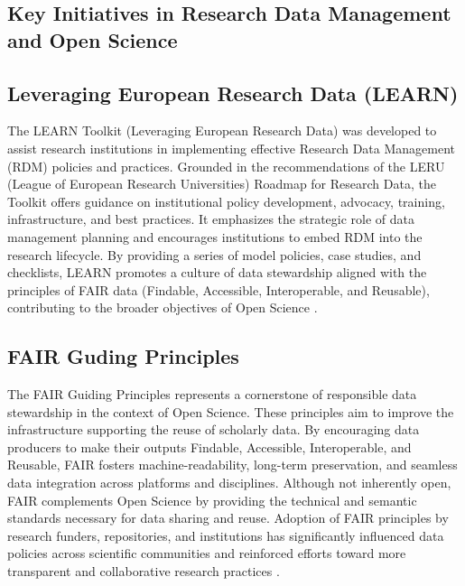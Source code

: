 \documentclass{article}
\begin{document}
\subsection{Key Initiatives in Research Data Management and Open Science}

\subsection{Leveraging European Research Data (LEARN)}
The LEARN Toolkit (Leveraging European Research Data) was developed to assist research institutions in implementing effective Research Data Management (RDM) policies and practices. Grounded in the recommendations of the LERU (League of European Research Universities) Roadmap for Research Data, the Toolkit offers guidance on institutional policy development, advocacy, training, infrastructure, and best practices. It emphasizes the strategic role of data management planning and encourages institutions to embed RDM into the research lifecycle. By providing a series of model policies, case studies, and checklists, LEARN promotes a culture of data stewardship aligned with the principles of FAIR data (Findable, Accessible, Interoperable, and Reusable), contributing to the broader objectives of Open Science \cite{learn_2017}.

\subsection{FAIR Guding Principles}
The FAIR Guiding Principles represents a cornerstone of responsible data stewardship in the context of Open Science. These principles aim to improve the infrastructure supporting the reuse of scholarly data. By encouraging data producers to make their outputs Findable, Accessible, Interoperable, and Reusable, FAIR fosters machine-readability, long-term preservation, and seamless data integration across platforms and disciplines. Although not inherently open, FAIR complements Open Science by providing the technical and semantic standards necessary for data sharing and reuse. Adoption of FAIR principles by research funders, repositories, and institutions has significantly influenced data policies across scientific communities and reinforced efforts toward more transparent and collaborative research practices \cite{wilkinson_fair_2016}.
\end{document}
